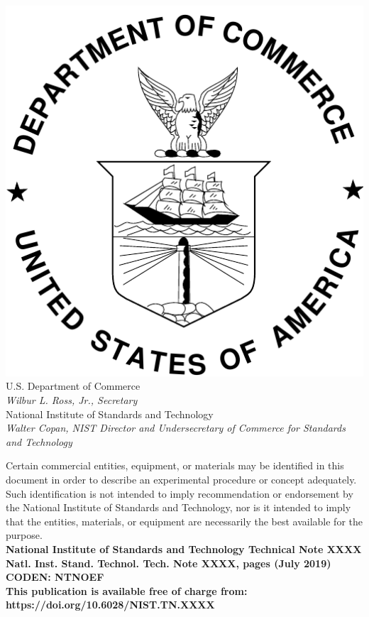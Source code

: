 \documentclass[12pt]{article}
\newcommand{\pubnumber}{XXXX}
\newcommand{\DOI}{https://doi.org/10.6028/NIST.TN.XXXX}
\newcommand{\monthyear}{July 2019}
\begin{document}
\begin{titlepage}
\begin{flushright}
\includegraphics[width=0.18\linewidth]{DoC-logo}\\
\vfill
\footnotesize U.S. Department of Commerce\\
\textit{Wilbur L. Ross, Jr., Secretary}\\
\vspace{10pt}
National Institute of Standards and Technology\\
\textit{Walter Copan, NIST Director and Undersecretary of Commerce for Standards and Technology}
\end{flushright}
\end{titlepage}

\begin{titlepage}
\begin{flushright}
\footnotesize  Certain commercial entities, equipment, or materials may be identified in this document in order to describe an experimental procedure or concept adequately. Such identification is not intended to imply recommendation or endorsement by the National Institute of Standards and Technology, nor is it intended to imply that the entities, materials, or equipment are necessarily the best available for the purpose.\\
\vfill
\normalsize \textbf{National Institute of Standards and Technology Technical Note \pubnumber\\
Natl. Inst. Stand. Technol. Tech. Note \pubnumber, \pageref{LastPage} pages (\monthyear)} \\
\textbf{CODEN: NTNOEF}\\
\vspace{12pt}
\textbf{This publication is available free of charge from: \DOI}
\vfill
\end{flushright}
\end{titlepage}
\end{document}
